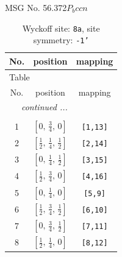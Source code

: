 \documentclass[fleqn,8pt]{jsarticle}
\begin{document}
\setcounter{MaxMatrixCols}{32}

\renewcommand{\tablename}{Table~}
\renewcommand{\figurename}{Figure~}
\begin{center}
\LARGE
MSG No. 56.372\quad$P_{b}ccn$
\end{center}
\renewcommand{\arraystretch}{1.2}
\begin{longtable}{ccc}
\caption{Wyckoff site: {\tt 8a}, site symmetry: {\tt -1'}}
 \\
 \hline \hline
No. & position & mapping \\ \hline \endfirsthead

\multicolumn{2}{l}{\tablename\ \thetable{}} \\
 \hline \hline
No. & position & mapping \\ \hline \endhead

 \hline \hline
\multicolumn{2}{r}{\footnotesize\it continued ...} \\ \endfoot

 \hline \hline
\multicolumn{2}{r}{} \\ \endlastfoot

1 & $\left[ 0,\, \frac{3}{4},\, 0 \right]$ & {\tt [1,13]} \\ \hline
2 & $\left[ \frac{1}{2},\, \frac{1}{4},\, \frac{1}{2} \right]$ & {\tt [2,14]} \\ \hline
3 & $\left[ 0,\, \frac{1}{4},\, \frac{1}{2} \right]$ & {\tt [3,15]} \\ \hline
4 & $\left[ \frac{1}{2},\, \frac{3}{4},\, 0 \right]$ & {\tt [4,16]} \\ \hline
5 & $\left[ 0,\, \frac{1}{4},\, 0 \right]$ & {\tt [5,9]} \\ \hline
6 & $\left[ \frac{1}{2},\, \frac{3}{4},\, \frac{1}{2} \right]$ & {\tt [6,10]} \\ \hline
7 & $\left[ 0,\, \frac{3}{4},\, \frac{1}{2} \right]$ & {\tt [7,11]} \\ \hline
8 & $\left[ \frac{1}{2},\, \frac{1}{4},\, 0 \right]$ & {\tt [8,12]} \\
\end{longtable}
\renewcommand{\arraystretch}{1.2}
\end{document}
